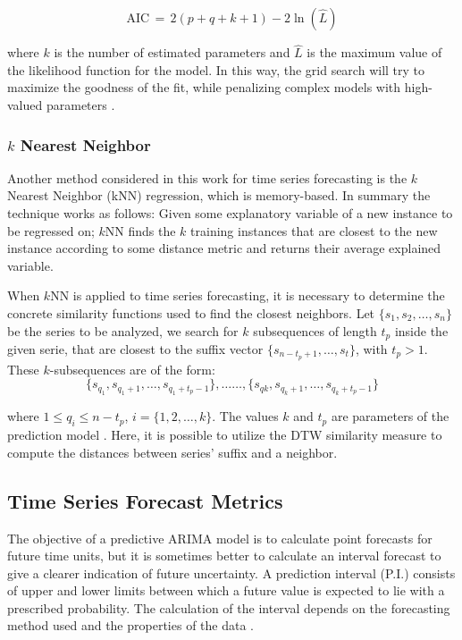 \begin{equation}
\mathrm{AIC} \, = \, 2(p + q+ k + 1) - 2\ln(\hat L)
\end{equation}

where $k$ is the number of estimated parameters and $\hat{L}$ is the maximum value of the likelihood function for the model. In this way, the grid search will try to maximize the goodness of the fit, while penalizing complex models with high-valued parameters \cite{Hyndman2018}.

\subsubsection{$k$ Nearest Neighbor}
\label{Sec:TheorykNN}

Another method considered in this work for time series forecasting is the $k$ Nearest Neighbor (kNN) regression, which is memory-based. In summary the technique works as follows: Given some explanatory variable of a new instance to be regressed on; $k$NN finds the $k$ training instances that are closest to the new instance according to some distance metric and returns their average explained variable.

When $k$NN is applied to time series forecasting, it is necessary to determine the concrete similarity functions used to find the closest neighbors. Let $\{s_{1}, s_{2}, \ldots, s_{n}\}$ be the series to be analyzed, we search for $k$ subsequences of length $t_p$ inside the given serie, that are closest to the suffix vector $\{s_{n-t_{p}+1},\ldots, s_{t}\}$, with $t_{p} >1$. These $k$-subsequences are of the form: 
\begin{equation*}
    \{s_{q_{1}}, s_{q_{1}+1}, \ldots, s_{q_{1}+t_{p}-1} \}, \ldots \ldots, \{s_{q{k}}, s_{q_{k}+1}, \ldots, s_{q_{k} + t_{p} -1} \}
\end{equation*}

where $1 \leq q_{i} \leq n - t_{p}$, $i = \{1, 2, \ldots, k\}$. The values $k$ and $t_{p}$ are parameters of the prediction model \cite{Ban2013}. Here, it is possible to utilize the DTW similarity measure to compute the distances between series' suffix and a neighbor.

\subsection{Time Series Forecast Metrics}
\label{Sec:ErrorTSA}
The objective of a predictive ARIMA model is to calculate point forecasts for future time units, but it is sometimes better to calculate an interval forecast to give a clearer indication of future uncertainty. A prediction interval (P.I.) consists of upper and lower limits between which a future value is expected to lie with a prescribed probability. The calculation of the interval depends on the forecasting method used and the properties of the data \cite{Chatfield2001}.

